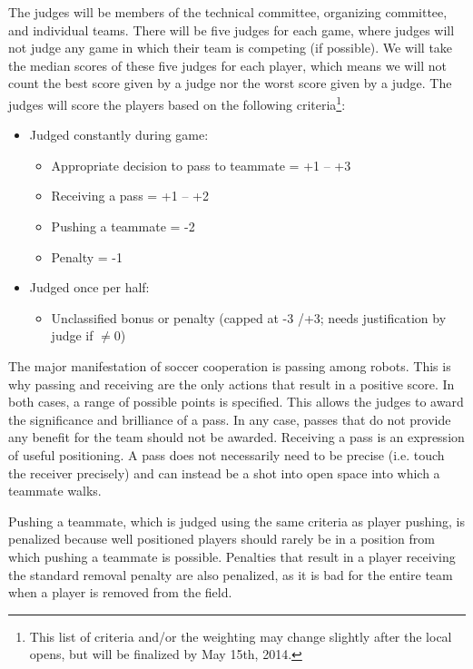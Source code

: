\documentclass[12pt]{article}
\begin{document}
The judges will be members of the technical committee, organizing committee, and individual teams.  There will be five judges for each game, where judges will not judge any game in which their team is competing (if possible).  We will take the median scores of these five judges for each player, which means we will not count the best score given by a judge nor the worst score given by a judge.  The judges will score the players based on the following criteria\footnote{This list of criteria and/or the weighting may change slightly after the local opens, but will be finalized by May 15th, 2014.}:
\begin{itemize}
\item Judged constantly during game:
  \begin{itemize}
  \item Appropriate decision to pass to teammate = +1 -- +3
  \item Receiving a pass = +1 -- +2
  \item Pushing a teammate = -2
  \item Penalty = -1
  \end{itemize}
\item Judged once per half:
  \begin{itemize}
   \item Unclassified bonus or penalty (capped at -3 /+3; needs justification by judge if $\neq 0$)
  \end{itemize}
\end{itemize}

The major manifestation of soccer cooperation is passing among robots. This is why passing and receiving are the only actions that result in a positive score. In both cases, a range of possible points is specified. This allows the judges to award the significance and brilliance of a pass. In any case, passes that do not provide any benefit for the team should not be awarded. Receiving a pass is an expression of useful positioning. A pass does not necessarily need to be precise (i.e. touch the receiver precisely) and can instead be a shot into open space into which a teammate walks.

Pushing a teammate, which is judged using the same criteria as player pushing, is penalized because well positioned players should rarely be in a position from which pushing a teammate is possible.  Penalties that result in a player receiving the standard removal penalty are also penalized, as it is bad for the entire team when a player is removed from the field.
\end{document}
